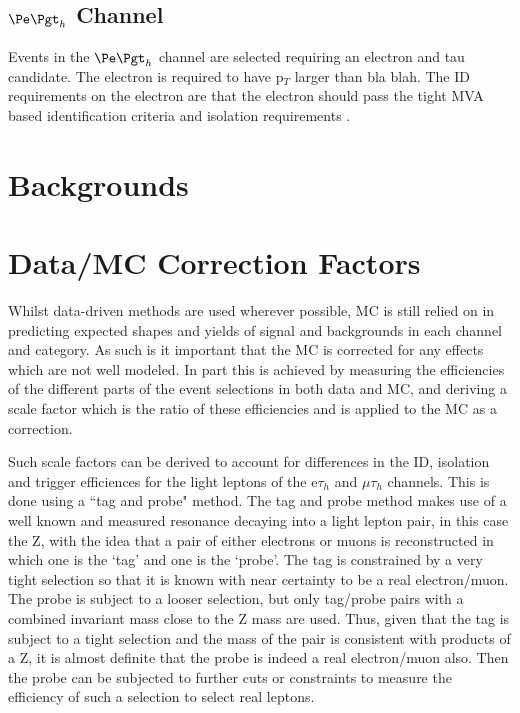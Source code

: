 \subsection{$\etau$ Channel}

Events in the $\etau$ channel are selected requiring an electron and tau
candidate. The electron is required to have p$_{T}$ larger than bla blah. The ID
requirements on the electron are that the electron should pass the tight MVA
based identification criteria and isolation requirements . 


\section{Backgrounds}
\label{sec:backgrounds}


\section{Data/MC Correction Factors}
\label{sec:datamcfactors}

Whilst data-driven methods are used wherever possible, MC is still
relied on in predicting expected shapes and yields of signal and backgrounds in
each channel and category. As such is it important that the MC is corrected for
any effects which are not well modeled. In part this is achieved by measuring
the efficiencies of the different parts of the event selections in both data and
MC, and deriving a scale factor which is the ratio of these efficiencies and is
applied to the MC as a correction.

Such scale factors can be derived to account for differences in the ID, isolation and trigger
efficiences for the light leptons of the e$\tau_{h}$ and $\mu\tau_{h}$ channels.
This is done using a ``tag and probe" method.
The tag and probe method makes use of a well known and measured resonance decaying
into a light lepton pair, in this case
the Z, with the idea that a pair of either electrons or muons is
reconstructed in which one
is the `tag' and one is the `probe'. The tag is constrained by a very tight
selection so that it is known with near certainty to be a real electron/muon.
The probe is subject to a looser selection, but only tag/probe pairs with a
combined invariant mass close to the Z mass are used. Thus, given that the tag
is subject to a tight selection and the mass of the pair is consistent with
products of a Z, it is almost definite that the probe is indeed a real
electron/muon also. Then the probe can be subjected to further cuts or
constraints to measure the efficiency of such a selection to select real
leptons.

